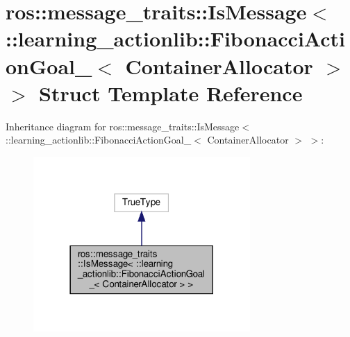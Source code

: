 \hypertarget{structros_1_1message__traits_1_1IsMessage_3_01_1_1learning__actionlib_1_1FibonacciActionGoal___3_01ContainerAllocator_01_4_01_4}{}\section{ros\+:\+:message\+\_\+traits\+:\+:Is\+Message$<$ \+:\+:learning\+\_\+actionlib\+:\+:Fibonacci\+Action\+Goal\+\_\+$<$ Container\+Allocator $>$ $>$ Struct Template Reference}
\label{structros_1_1message__traits_1_1IsMessage_3_01_1_1learning__actionlib_1_1FibonacciActionGoal___3_01ContainerAllocator_01_4_01_4}


Inheritance diagram for ros\+:\+:message\+\_\+traits\+:\+:Is\+Message$<$ \+:\+:learning\+\_\+actionlib\+:\+:Fibonacci\+Action\+Goal\+\_\+$<$ Container\+Allocator $>$ $>$\+:
\nopagebreak
\begin{figure}[H]
\begin{center}
\leavevmode
\includegraphics[width=234pt]{structros_1_1message__traits_1_1IsMessage_3_01_1_1learning__actionlib_1_1FibonacciActionGoal___34d1134fc595f757f9a8aba8fc3e1183c}
\end{center}
\end{figure}


